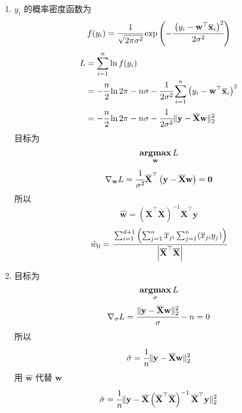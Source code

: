 \documentclass[11pt,letter,notitlepage]{article}
\DeclareMathOperator*{\argmax}{\bf argmax}
\begin{document}
\begin{solution}
    \begin{enumerate}
        \item $y_i$ 的概率密度函数为
              $$f(y_i) =\cfrac{1}{\sqrt{2\pi\sigma^2}}\exp \left( -\cfrac{\left( y_i - \mathbf{w}^\top \overline{\mathbf{x}}_i \right)^2}{2\sigma^2} \right)$$
              $$\begin{aligned}
                      L & =\sum_{i=1}^n \ln f(y_i)                                                                                                        \\
                        & =-\cfrac{n}{2}\ln 2\pi -n\sigma-\cfrac{1}{2\sigma^2}\sum_{i=1}^n \left( y_i - \mathbf{w}^\top \overline{\mathbf{x}}_i \right)^2 \\
                        & =-\cfrac{n}{2}\ln 2\pi -n\sigma-\cfrac{1}{2\sigma^2} \|\mathbf{y}-\overline{\mathbf{X}}\mathbf{w}\|_2^2
                  \end{aligned}$$
              目标为
              $$\argmax_{\mathbf{w}} L$$
              $$\nabla_{\mathbf{w}} L=\cfrac{1}{\sigma^2}\overline{\mathbf{X}}^\top \left( \mathbf{y}-\overline{\mathbf{X}}\mathbf{w} \right)=\mathbf{0}$$
              所以 $$\hat{\mathbf{w}}=\left(\overline{\mathbf{X}}^\top \overline{\mathbf{X}}\right)^{-1} \overline{\mathbf{X}}^\top \mathbf{y}$$
                $$\hat{w}_0=\cfrac{\sum_{i=1}^{d+1} \left( \sum_{j=1}^n \overline{x}_{ji} \sum_{j=1}^n(\overline{x}_{ji} y_{j}) \right) }{\left| \overline{\mathbf{X}}^\top \overline{\mathbf{X}} \right|}$$
        \item 目标为 $$\argmax_\sigma L$$
              $$\nabla_\sigma L=\cfrac{\|\mathbf{y}-\overline{\mathbf{X}}\mathbf{w}\|_2^2}{\sigma}-n=0$$
              所以 $$\hat{\sigma}=\cfrac{1}{n}\|\mathbf{y}-\overline{\mathbf{X}}\mathbf{w}\|_2^2$$
              用 $\hat{\mathbf{w}}$ 代替 $\mathbf{w}$
              $$\hat{\sigma}=\cfrac{1}{n}\|\mathbf{y}-\overline{\mathbf{X}}\left(\overline{\mathbf{X}}^\top \overline{\mathbf{X}}\right)^{-1} \overline{\mathbf{X}}^\top \mathbf{y}\|_2^2$$
    \end{enumerate}
\end{solution}

\newpage
\end{document}
